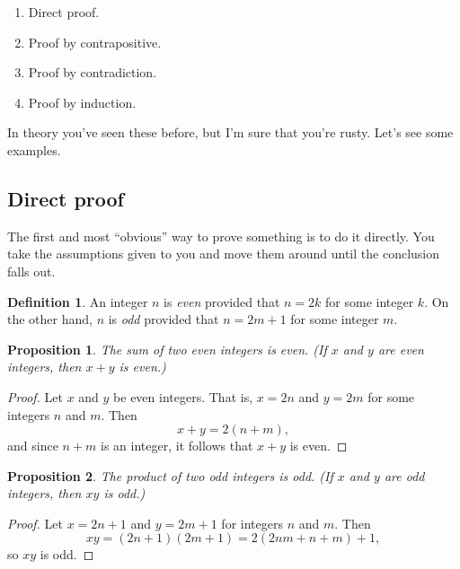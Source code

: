 \documentclass[12pt]{article}
\newtheorem{proposition}{Proposition}
\theoremstyle{definition}
\newtheorem{definition}{Definition}
\begin{document}
\begin{enumerate}
    \item Direct proof.
    \item Proof by contrapositive.
    \item Proof by contradiction.
    \item Proof by induction.
\end{enumerate}

In theory you've seen these before, but I'm sure that you're rusty. Let's see
some examples.

\subsection*{Direct proof}

The first and most ``obvious'' way to prove something is to do it directly. You
take the assumptions given to you and move them around until the conclusion
falls out.

\begin{definition}
    An integer $n$ is \emph{even} provided that $n = 2k$ for some integer $k$.
    On the other hand, $n$ is \emph{odd} provided that $n = 2m + 1$ for some
    integer $m$.
\end{definition}

\begin{proposition}
    The sum of two even integers is even. (If $x$ and $y$ are even integers,
    then $x + y$ is even.)
\end{proposition}

\begin{proof}
    Let $x$ and $y$ be even integers. That is, $x = 2n$ and $y = 2m$ for some
    integers $n$ and $m$. Then
    \begin{equation*}
        x + y = 2(n + m),
    \end{equation*}
    and since $n + m$ is an integer, it follows that $x + y$ is even.
\end{proof}

\begin{proposition}
    The product of two odd integers is odd. (If $x$ and $y$ are odd integers,
    then $xy$ is odd.)
\end{proposition}

\begin{proof}
    Let $x = 2n + 1$ and $y = 2m + 1$ for integers $n$ and $m$. Then
    \begin{equation*}
        xy = (2n + 1)(2m + 1) = 2(2nm + n + m) + 1,
    \end{equation*}
    so $xy$ is odd.
\end{proof}
\end{document}
